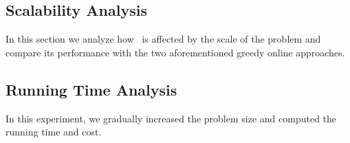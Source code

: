 




\subsection{Scalability Analysis}
In this section we analyze how \myalgorithm\ is affected by the scale of the problem and compare its performance with the two aforementioned greedy online approaches.

\subsection{Running Time Analysis}
In this experiment, we gradually increased the problem size and computed the running time and cost. 

